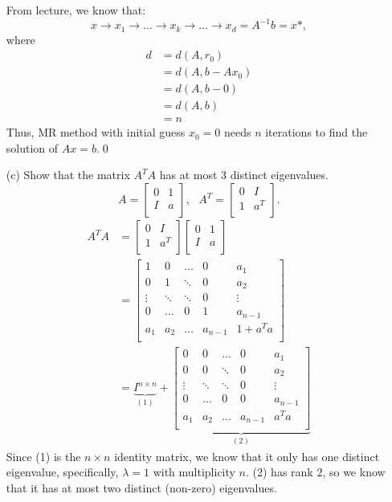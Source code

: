 \documentclass[12pt]{article}
\begin{document}
\begin{itemize}
From lecture, we know that:
$$x\to x_1 \to \dots \to x_k \to \dots \to x_d = A^{-1}b = x*,$$
where
\begin{align}
d &= d(A,r_0) \nonumber \\
&= d(A,b-Ax_0) \nonumber \\
&= d(A,b-0) \nonumber \\
&= d(A,b) \nonumber \\
&= n \nonumber
\end{align} 
Thus, MR method with initial guess $x_0 = 0$ needs $n$ iterations to find the solution of $Ax=b$.\qed\\

\item[(c)] Show that the matrix $A^TA$ has at most 3 distinct eigenvalues.\\

$$A = \begin{bmatrix}
		0 & 1 \\
		I & a \\
		\end{bmatrix} , \text{ } A^T = \begin{bmatrix}
									0 & I \\
									1 & a^T \\
									\end{bmatrix}.$$
\begin{align}
A^TA &= \begin{bmatrix}
		0 & I \\
		1 & a^T \\
		\end{bmatrix}\begin{bmatrix}
		0 & 1 \\
		I & a \\
		\end{bmatrix} \nonumber \\
&= \begin{bmatrix}
	1 & 0 & \hdots & 0 & a_1 \\
	0 & 1 & \ddots & 0 & a_2 \\
	\vdots & \ddots & \ddots & 0 & \vdots \\
	0 & \hdots & 0 & 1 & a_{n-1} \\
	a_1 & a_2 & \hdots & a_{n-1} & 1 + a^Ta \\
	\end{bmatrix} \nonumber \\
&= \underbrace{I^{n\times n}}_{(1)} + \underbrace{\begin{bmatrix}
			0 & 0 & \hdots & 0 & a_1 \\
			0 & 0 & \ddots & 0 & a_2 \\
			\vdots & \ddots & \ddots & 0 & \vdots \\
			0 & \hdots & 0 & 0 & a_{n-1} \\
			a_1 & a_2 & \hdots & a_{n-1} & a^Ta \\
			\end{bmatrix}}_{(2)} \nonumber 
\end{align}
Since (1) is the $n\times n$ identity matrix, we know that it only has one distinct eigenvalue, specifically, $\lambda = 1$ with multiplicity $n$.  (2) has rank 2, so we know that it has at most two distinct (non-zero) eigenvalues.\\


\end{itemize}
\end{document}
